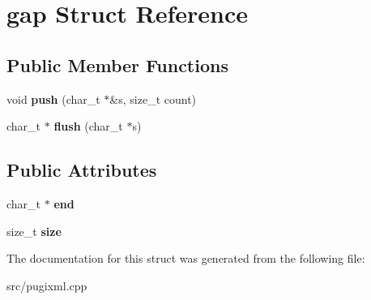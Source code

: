 \hypertarget{structgap}{}\section{gap Struct Reference}
\label{structgap}
\subsection*{Public Member Functions}
\begin{DoxyCompactItemize}
\item 
\mbox{\label{structgap_a9c0d0b12bc778c8439c8aec7747ab2b0}} 
void {\bfseries push} (char\+\_\+t $\ast$\&s, size\+\_\+t count)
\item 
\mbox{\label{structgap_a176c58ee8d57c41b91ae9f00d5e8cab5}} 
char\+\_\+t $\ast$ {\bfseries flush} (char\+\_\+t $\ast$s)
\end{DoxyCompactItemize}
\subsection*{Public Attributes}
\begin{DoxyCompactItemize}
\item 
\mbox{\label{structgap_a1fafd4d9909a3413f723f24e46dfde0e}} 
char\+\_\+t $\ast$ {\bfseries end}
\item 
\mbox{\label{structgap_ad5bb3597ade78d89bbe0e300748ad508}} 
size\+\_\+t {\bfseries size}
\end{DoxyCompactItemize}


The documentation for this struct was generated from the following file\+:\begin{DoxyCompactItemize}
\item 
src/pugixml.\+cpp\end{DoxyCompactItemize}
